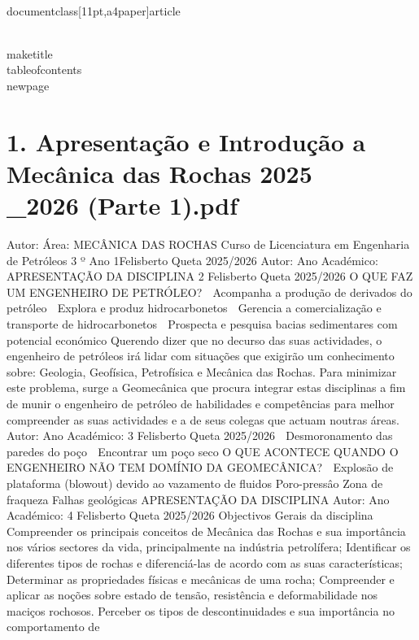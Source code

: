 \\documentclass[11pt,a4paper]{article}
\begin{document}
\\maketitle
\\tableofcontents
\\newpage


\section*{1. Apresentação e Introdução a Mecânica das Rochas 2025\\_2026 (Parte 1).pdf}


Autor:
Área:
MECÂNICA DAS ROCHAS
Curso de Licenciatura em Engenharia de Petróleos
3 º Ano
1Felisberto Queta
2025/2026
Autor:
Ano Académico:
APRESENTAÇÃO DA DISCIPLINA 2
Felisberto Queta
2025/2026
O QUE FAZ UM ENGENHEIRO DE PETRÓLEO? 
 Acompanha 
a produção de derivados 
do petróleo
 Explora e produz 
hidrocarbonetos
 Gerencia a  comercialização 
e transporte de 
hidrocarbonetos
 Prospecta e pesquisa 
bacias sedimentares com 
potencial económico
Querendo dizer que no decurso das suas
actividades, o engenheiro de petróleos irá
lidar com situações que exigirão um
conhecimento sobre:
Geologia, Geofísica, Petrofísica e
Mecânica das Rochas.
Para minimizar este problema, surge a
Geomecânica que procura integrar estas
disciplinas a fim de munir o engenheiro de
petróleo de habilidades e competências para
melhor compreender as suas actividades e a
de seus colegas que actuam noutras áreas.
Autor:
Ano Académico:
3
Felisberto Queta
2025/2026
 Desmoronamento das paredes do poço
 Encontrar um poço seco
O QUE ACONTECE QUANDO O ENGENHEIRO NÃO TEM DOMÍNIO DA GEOMECÂNICA? 
 Explosão de plataforma (blowout) devido 
ao vazamento de fluidos
Poro-pressâo Zona de 
fraqueza
Falhas 
geológicas
APRESENTAÇÃO DA DISCIPLINA
Autor:
Ano Académico:
4
Felisberto Queta
2025/2026
Objectivos Gerais da disciplina
Compreender os principais conceitos de Mecânica das Rochas e sua importância nos 
vários sectores da vida, principalmente na indústria petrolífera;
Identificar os diferentes tipos de rochas e diferenciá-las de acordo com as suas 
características;
Determinar as propriedades físicas e mecânicas de uma rocha;
Compreender e aplicar as noções sobre estado de tensão,  resistência e 
deformabilidade nos maciços rochosos. 
Perceber os tipos de descontinuidades e sua importância no comportamento de 
\end{document}
